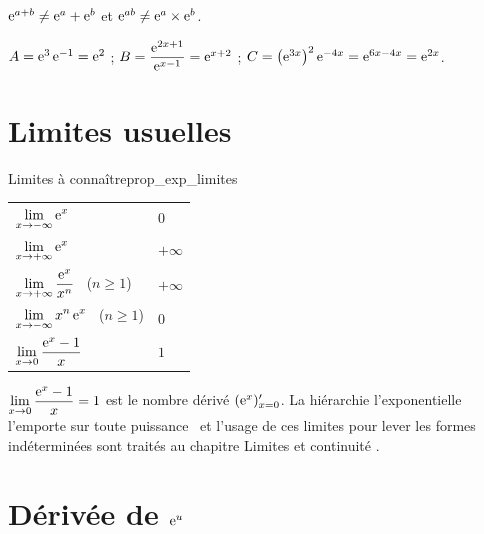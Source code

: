 \begin{attention}
	$\mathrm{e}^{a+b}\neq\mathrm{e}^{a}+\mathrm{e}^{b}$ \quad et \quad $\mathrm{e}^{ab}\neq\mathrm{e}^{a}\times\mathrm{e}^{b}$.
\end{attention}

\begin{exemple}
	$A=\mathrm{e}^{3}\,\mathrm{e}^{-1}=\mathrm{e}^{2}$ ;
	\quad
	$B=\dfrac{\mathrm{e}^{2x+1}}{\mathrm{e}^{x-1}}=\mathrm{e}^{x+2}$ ;
	\quad
	$C=\bigl(\mathrm{e}^{3x}\bigr)^{2}\,\mathrm{e}^{-4x}=\mathrm{e}^{6x-4x}=\mathrm{e}^{2x}$.
\end{exemple}


\section{Limites usuelles}

\begin{propriete}{Limites à connaître}{prop_exp_limites}
	\begin{center}
	\renewcommand{\arraystretch}{2.0}
	\begin{tabular}{>{\raggedright\arraybackslash}p{5.4cm}
	                >{\centering\arraybackslash}p{2.0cm}}
	\hline
	$\displaystyle\lim_{x\to-\infty}\mathrm{e}^{x}$                    & $0$ \\
	$\displaystyle\lim_{x\to+\infty}\mathrm{e}^{x}$                    & $+\infty$ \\
	$\displaystyle\lim_{x\to+\infty}\dfrac{\mathrm{e}^{x}}{x^{n}}$ \ ($n\geq 1$) & $+\infty$ \\
	$\displaystyle\lim_{x\to-\infty}x^{n}\,\mathrm{e}^{x}$ \ ($n\geq 1$) & $0$ \\
	$\displaystyle\lim_{x\to 0}\dfrac{\mathrm{e}^{x}-1}{x}$            & $1$ \\
	\hline
	\end{tabular}
	\end{center}
\end{propriete}

\begin{remarque}
	$\displaystyle\lim_{x\to 0}\frac{\mathrm{e}^{x}-1}{x}=1$ est le nombre dérivé
	$(\mathrm{e}^{x})'_{x=0}$. La hiérarchie \og l'exponentielle l'emporte sur toute
	puissance \fg\ et l'usage de ces limites pour lever les formes
	indéterminées sont traités au chapitre \og Limites et continuité \fg.
\end{remarque}


\section{Dérivée de \texorpdfstring{$\mathrm{e}^{u}$}{e^u}}

